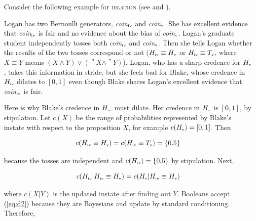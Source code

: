 \documentclass[phd,12pt,oneside]{ubcthesis}
\begin{document}
Consider the following example for \textsc{dilation} (see
 and ).

\begin{quotex}
  \label{ex:dilation} Logan has two Bernoulli
  generators, \textit{coin}$_{\mbox{\tiny{iv}}}$ and
  \textit{coin}$_{\mbox{\tiny{v}}}$. She has excellent evidence that
  \textit{coin}$_{\mbox{\tiny{iv}}}$ is fair and no evidence about the
  bias of \textit{coin}$_{\mbox{\tiny{v}}}$. Logan's graduate student
  independently tosses both \textit{coin}$_{\mbox{\tiny{iv}}}$ and
  \textit{coin}$_{\mbox{\tiny{v}}}$. Then she tells Logan whether the
  results of the two tosses correspond or not
  ($H_{\mbox{\tiny{iv}}}\equiv{}H_{\mbox{\tiny{v}}}$ or
  $H_{\mbox{\tiny{iv}}}\equiv{}T_{\mbox{\tiny{v}}}$, where
  $X\equiv{}Y$ means
  $(X\wedge{}Y)\vee(\urcorner{}X\wedge\urcorner{}Y)$). Logan, who has
  a sharp credence for $H_{\mbox{\tiny{v}}}$, takes this information
  in stride, but she feels bad for Blake, whose credence in
  $H_{\mbox{\tiny{iv}}}$ dilates to $[0,1]$ even though Blake shares
  Logan's excellent evidence that \textit{coin}$_{\mbox{\tiny{iv}}}$
  is fair.
\end{quotex}

Here is why Blake's credence in $H_{\mbox{\tiny{iv}}}$ must dilate.
Her credence in $H_{\mbox{\tiny{v}}}$ is $[0,1]$, by stipulation. Let
$c(X)$ be the range of probabilities represented by Blake's instate
with respect to the proposition $X$, for example
$c(H_{\mbox{\tiny{v}}})=[0,1]$. Then

\begin{equation}
  \label{eq:d1}
  c(H_{\mbox{\tiny{iv}}}\equiv{}H_{\mbox{\tiny{v}}})=c(H_{\mbox{\tiny{iv}}}\equiv{}T_{\mbox{\tiny{v}}})=\{0.5\}
\end{equation}

{\noindent}because the tosses are independent and
$c(H_{\mbox{\tiny{iv}}})=\{0.5\}$ by stipulation. Next,

\begin{equation}
  \label{eq:d2}
  c(H_{\mbox{\tiny{iv}}}|H_{\mbox{\tiny{iv}}}\equiv{}H_{\mbox{\tiny{v}}})=c(H_{\mbox{\tiny{v}}}|H_{\mbox{\tiny{iv}}}\equiv{}H_{\mbox{\tiny{v}}})
\end{equation}

{\noindent}where $c(X|Y)$ is the updated instate after finding out $Y$. Booleans
accept (\ref{eq:d2}) because they are Bayesians and update by standard
conditioning. Therefore,

\end{document}
